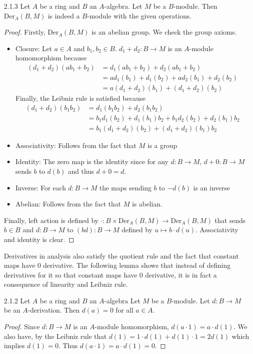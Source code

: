 \documentclass[a4paper]{article}
\begin{document}
\begin{lmm}{}{2.1.3} Let $A$ be a ring and $B$ an $A$-algebra. Let $M$ be a $B$-module. Then $\text{Der}_A(B,M)$ is indeed a $B$-module with the given operations. \tcbline
\begin{proof}
Firstly, $\text{Der}_A(B,M)$ is an abelian group. We check the group axioms. 
\begin{itemize}
\item Closure: Let $a\in A$ and $b_1,b_2\in B$. $d_1+d_2:B\to M$ is an $A$-module homomorphism because 
\begin{align*}
(d_1+d_2)(ab_1+b_2)&=d_1(ab_1+b_2)+d_2(ab_1+b_2)\\
&=ad_1(b_1)+d_1(b_2)+ad_2(b_1)+d_2(b_2)\\
&=a(d_1+d_2)(b_1)+(d_1+d_2)(b_2)
\end{align*}
Finally, the Leibniz rule is satisfied because 
\begin{align*}
(d_1+d_2)(b_1b_2)&=d_1(b_1b_2)+d_2(b_1b_2)\\
&=b_1d_1(b_2)+d_1(b_1)b_2+b_1d_2(b_2)+d_2(b_1)b_2\\
&=b_1(d_1+d_2)(b_2)+(d_1+d_2)(b_1)b_2
\end{align*}
\item Associativity: Follows from the fact that $M$ is a group
\item Identity: The zero map is the identity since for any $d:B\to M$, $d+0:B\to M$ sends $b$ to $d(b)$ and thus $d+0=d$. 
\item Inverse: For each $d:B\to M$ the maps sending $b$ to $-d(b)$ is an inverse
\item Abelian: Follows from the fact that $M$ is abelian. 
\end{itemize}
Finally, left action is defined by $\cdot:B\times\text{Der}_A(B,M)\to\text{Der}_A(B,M)$ that sends $b\in B$ and $d:B\to M$ to $(bd):B\to M$ defined by $u\mapsto b\cdot d(u)$. Associativity and identity is clear. 
\end{proof}
\end{lmm}

Derivatives in analysis also satisfy the quotient rule and the fact that constant maps have $0$ derivative. The following lemma shows that instead of defining derivatives for it so that constant maps have $0$ derivative, it is in fact a consequence of linearity and Leibniz rule. 

\begin{lmm}{}{2.1.2} Let $A$ be a ring and $B$ an $A$-algebra Let $M$ be a $B$-module. Let $d:B\to M$ be an $A$-derivation. Then $d(a)=0$ for all $a\in A$. \tcbline
\begin{proof}
Since $d:B\to M$ is an $A$-module homomorphism, $d(a\cdot 1)=a\cdot d(1)$. We also have, by the Leibniz rule that $d(1)=1\cdot d(1)+d(1)\cdot 1=2d(1)$ which implies $d(1)=0$. Thus $d(a\cdot 1)=a\cdot d(1)=0$. 
\end{proof}
\end{lmm}
\end{document}
